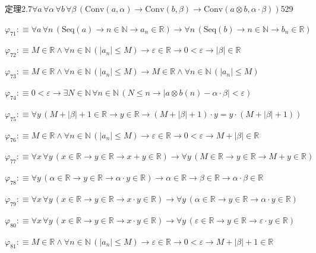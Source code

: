 \begin{fullproof}{定理2.7}{$\forall a\,\forall \alpha\,\forall b\,\forall \beta\,(\mathrm{Conv}(a,\alpha) \to \mathrm{Conv}(b,\beta) \to \mathrm{Conv}(a \otimes b,\alpha \cdot \beta))$}{529}
\begin{abbrevlist}
\item $\varphi_{71} :\equiv \forall a\,\forall n\,(\mathrm{Seq}(a) \to n \in \mathbb{N} \to a_{n} \in \mathbb{R}) \to \forall n\,(\mathrm{Seq}(b) \to n \in \mathbb{N} \to b_{n} \in \mathbb{R})$
\item $\varphi_{72} :\equiv M \in \mathbb{R} \land \forall n \in \mathbb{N}\,(\lvert a_{n} \rvert \leq M) \to \varepsilon \in \mathbb{R} \to 0 < \varepsilon \to \lvert \beta \rvert \in \mathbb{R}$
\item $\varphi_{73} :\equiv M \in \mathbb{R} \land \forall n \in \mathbb{N}\,(\lvert a_{n} \rvert \leq M) \to M \in \mathbb{R} \land \forall n \in \mathbb{N}\,(\lvert a_{n} \rvert \leq M)$
\item $\varphi_{74} :\equiv 0 < \varepsilon \to \exists N \in \mathbb{N}\,\forall n \in \mathbb{N}\,(N \leq n \to \lvert a \otimes b(n) - \alpha \cdot \beta \rvert < \varepsilon)$
\item $\varphi_{75} :\equiv \forall y\,(M + \lvert \beta \rvert + 1 \in \mathbb{R} \to y \in \mathbb{R} \to (M + \lvert \beta \rvert + 1) \cdot y = y \cdot (M + \lvert \beta \rvert + 1))$
\item $\varphi_{76} :\equiv M \in \mathbb{R} \land \forall n \in \mathbb{N}\,(\lvert a_{n} \rvert \leq M) \to \varepsilon \in \mathbb{R} \to 0 < \varepsilon \to M + \lvert \beta \rvert \in \mathbb{R}$
\item $\varphi_{77} :\equiv \forall x\,\forall y\,(x \in \mathbb{R} \to y \in \mathbb{R} \to x + y \in \mathbb{R}) \to \forall y\,(M \in \mathbb{R} \to y \in \mathbb{R} \to M + y \in \mathbb{R})$
\item $\varphi_{78} :\equiv \forall y\,(\alpha \in \mathbb{R} \to y \in \mathbb{R} \to \alpha \cdot y \in \mathbb{R}) \to \alpha \in \mathbb{R} \to \beta \in \mathbb{R} \to \alpha \cdot \beta \in \mathbb{R}$
\item $\varphi_{79} :\equiv \forall x\,\forall y\,(x \in \mathbb{R} \to y \in \mathbb{R} \to x \cdot y \in \mathbb{R}) \to \forall y\,(\alpha \in \mathbb{R} \to y \in \mathbb{R} \to \alpha \cdot y \in \mathbb{R})$
\item $\varphi_{80} :\equiv \forall x\,\forall y\,(x \in \mathbb{R} \to y \in \mathbb{R} \to x \cdot y \in \mathbb{R}) \to \forall y\,(\varepsilon \in \mathbb{R} \to y \in \mathbb{R} \to \varepsilon \cdot y \in \mathbb{R})$
\item $\varphi_{81} :\equiv M \in \mathbb{R} \land \forall n \in \mathbb{N}\,(\lvert a_{n} \rvert \leq M) \to \varepsilon \in \mathbb{R} \to 0 < \varepsilon \to M + \lvert \beta \rvert + 1 \in \mathbb{R}$

\end{abbrevlist}
\end{fullproof}
